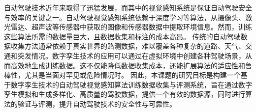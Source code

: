 \begin{abstractzh}


自动驾驶技术近年来取得了迅猛发展，而其中的视觉感知系统是保证自动驾驶安全与效率的关键之一。自动驾驶视觉感知系统依赖于深度学习等算法，从摄像头、激光雷达、超声波等传感器中获取的图像和传感器数据中提取环境信息。然而，训练这些算法所需的数据量巨大，且数据收集和标注的成本高昂。
传统的自动驾驶数据收集方法通常依赖于真实世界的路测数据，难以覆盖各种复杂的道路、天气、交通和突发情况。数字孪生技术的应用可以通过在虚拟环境中创建各种驾驶场景，从而高效地生成训练数据。这不仅能降低数据收集成本，还能扩展算法的适应性和鲁棒性，尤其是当面对罕见或危险情况时。
因此，本课题的研究目标是构建一个基于数字孪生技术的自动驾驶视觉感知算法训练数据收集与评测系统，旨在通过数字孪生模拟和生成多样化、高质量的驾驶数据，提供一个有效的数据源，同时进行算法的验证与评测，提升自动驾驶技术的安全性与可靠性。


\end{abstractzh}